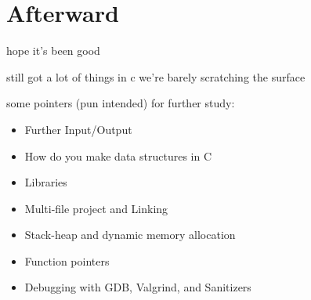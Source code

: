 \chapter{Afterward}

hope it's been good

still got a lot of things in c we're barely scratching the surface

some pointers (pun intended) for further study:
\begin{itemize}
\item Further Input/Output
\item How do you make data structures in C
\item Libraries
\item Multi-file project and Linking
\item Stack-heap and dynamic memory allocation
\item Function pointers 
\item Debugging with GDB, Valgrind, and Sanitizers
\end{itemize}